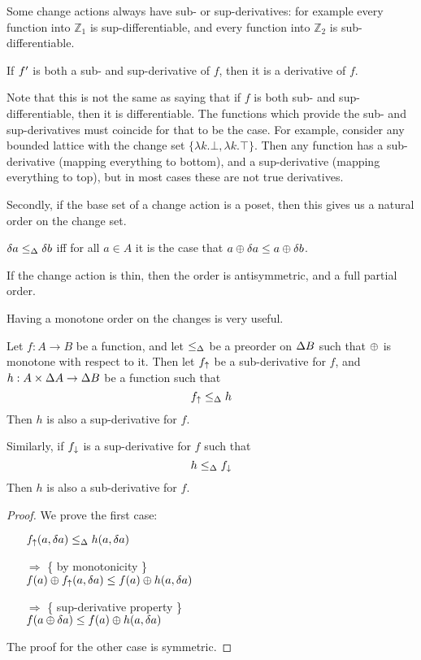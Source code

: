 Some change actions always have sub- or sup-derivatives: for example every function
into $\mathbb{Z}_1$ is sup-differentiable, and every function into $\mathbb{Z}_2$ is 
sub-differentiable.

\begin{prop}
  If $f'$ is both a sub- and sup-derivative of $f$, then it is a derivative of $f$.
\end{prop}

Note that this is not the same as saying that if $f$ is both sub- and
sup-differentiable, then it is differentiable. The functions which provide the
sub- and sup-derivatives must coincide for that to be the case. For example,
consider any bounded lattice with the change set $\{ \lambda k . \bot, \lambda k
 . \top \}$. Then any function has a sub-derivative (mapping everything to
 bottom), and a sup-derivative (mapping everything to top), but in most cases
 these are not true derivatives.

Secondly, if the base set of a change action is a poset, then this gives us a natural
order on the change set.

\begin{defn}
  $\delta a \leq_\Delta \delta b$ iff for all $a \in A$ it is the case that $a \oplus \delta a \leq a \oplus \delta b$.
\end{defn}

If the change action is thin, then the order is antisymmetric, and a
full partial order.

Having a monotone order on the changes is very useful.

\begin{thm}
  Let $f: A \rightarrow B$ be a function, and let $\leq_\Delta$ be a preorder on $\Delta B$ such that $\oplus$ is monotone with
  respect to it. Then let $f_\uparrow$ be a sub-derivative for $f$, and $h: A \times
  \Delta A \rightarrow \Delta B$ be a function such that
  $$f_\uparrow \leq_\Delta h$$
  Then $h$ is also a sup-derivative for $f$.

  Similarly, if $f_\downarrow$ is a sup-derivative for $f$ such that 
  $$h \leq_\Delta f_\downarrow$$
  Then $h$ is also a sub-derivative for $f$.
\end{thm}
\ifproofs
\begin{proof}
  We prove the first case:
  \begin{itemize}
    \item[ ]$f_\uparrow(a, \delta a) \leq_\Delta h(a, \delta a)$
    \item[$\Rightarrow$]\{ by monotonicity \}\\
      $f(a) \oplus f_\uparrow(a, \delta a) \leq f(a) \oplus h(a, \delta a)$
    \item[$\Rightarrow$]\{ sup-derivative property \}\\
      $f(a \oplus \delta a) \leq f(a) \oplus h(a, \delta a)$
  \end{itemize}

  The proof for the other case is symmetric.
\end{proof}
\fi

